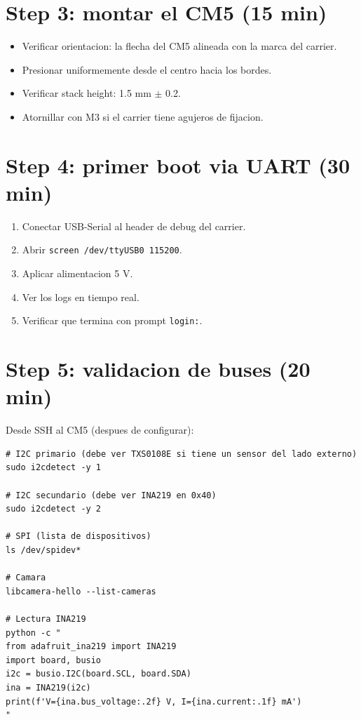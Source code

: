 \documentclass[11pt,a4paper,oneside,openright]{book}
\begin{document}
\section{Step 3: montar el CM5 (15 min)}

\begin{itemize}[leftmargin=2em]
  \item Verificar orientacion: la flecha del CM5 alineada con la marca
        del carrier.
  \item Presionar uniformemente desde el centro hacia los bordes.
  \item Verificar stack height: 1.5 mm $\pm$ 0.2.
  \item Atornillar con M3 si el carrier tiene agujeros de fijacion.
\end{itemize}

\section{Step 4: primer boot via UART (30 min)}

\begin{enumerate}[leftmargin=2em]
  \item Conectar USB-Serial al header de debug del carrier.
  \item Abrir \texttt{screen /dev/ttyUSB0 115200}.
  \item Aplicar alimentacion 5 V.
  \item Ver los logs en tiempo real.
  \item Verificar que termina con prompt \texttt{login:}.
\end{enumerate}

\section{Step 5: validacion de buses (20 min)}

Desde SSH al CM5 (despues de configurar):

\begin{lstlisting}
# I2C primario (debe ver TXS0108E si tiene un sensor del lado externo)
sudo i2cdetect -y 1

# I2C secundario (debe ver INA219 en 0x40)
sudo i2cdetect -y 2

# SPI (lista de dispositivos)
ls /dev/spidev*

# Camara
libcamera-hello --list-cameras

# Lectura INA219
python -c "
from adafruit_ina219 import INA219
import board, busio
i2c = busio.I2C(board.SCL, board.SDA)
ina = INA219(i2c)
print(f'V={ina.bus_voltage:.2f} V, I={ina.current:.1f} mA')
"
\end{lstlisting}
\end{document}
